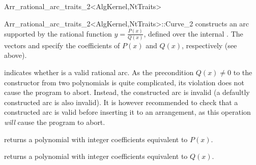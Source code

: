 \begin{ccRefClass}{Arr_rational_arc_traits_2<AlgKernel,NtTraits>}
\begin{ccClass}{Arr_rational_arc_traits_2<AlgKernel,NtTraits>::Curve_2}
  {constructs an arc supported by the rational function
   $y = \frac{P(x)}{Q(x)}$, defined over the internal .
   The vectors  and  specify the coefficients
   of $P(x)$ and $Q(x)$, respectively (see above).
   }

\ccAccessFunctions

  {indicates whether \ccVar{} is a valid rational arc. As the precondition 
   $Q(x) \neq 0$ to the constructor from two polynomials is quite complicated,
   its violation does not cause the program to abort. Instead, the constructed
   arc is invalid (a defaultly constructed arc is also invalid).
   It is however recommended to check that a constructed arc is valid before
   inserting it to an arrangement, as this operation {\sl will} cause the
   program to abort.}

  {returns a polynomial with integer coefficients equivalent to $P(x)$.}

  {returns a polynomial with integer coefficients equivalent to $Q(x)$.}


\end{ccClass}

\end{ccRefClass}
\ccRefPageEnd
